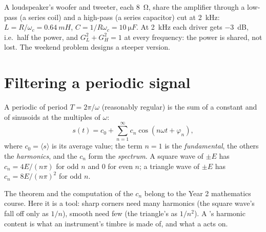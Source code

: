 \begin{example}[A crossover]\label{ex:b1:filters-transfer-functions:crossover}
A loudspeaker's woofer and tweeter, each \qty{8}{\ohm}, share the
amplifier through a low-pass (a series coil) and a high-pass (a series
capacitor) cut at \qty{2}{kHz}: $L = R/\omega_c = \qty{0.64}{mH}$,
$C = 1/R\omega_c = \qty{10}{\micro F}$. At \qty{2}{kHz} each driver gets
\qty{-3}{dB}, i.e.\ half the power, and $G_L^2 + G_H^2 = 1$ at every
frequency: the power is shared, not lost. The weekend problem designs
a steeper version.
\end{example}

\section{Filtering a periodic signal}

\begin{theorem}\label{thm:b1:filters-transfer-functions:fourier}
A periodic  of period $T = 2\pi/\omega$ (reasonably regular) is
the sum of a constant and of sinusoids at the multiples of $\omega$:
\[
s(t) = c_0 + \sum_{n = 1}^{\infty} c_n\cos(n\omega t + \varphi_n),
\]
where $c_0 = \langle s\rangle$ is its average value; the term $n = 1$ is
the \emph{fundamental}, the others the \emph{harmonics}, and the
 $c_n$ form the \emph{spectrum}. A square wave of 
$\pm E$ has $c_n = 4E/(n\pi)$ for odd $n$ and $0$ for even $n$; a
triangle wave of  $\pm E$ has $c_n = 8E/(n\pi)^2$ for odd $n$.
\end{theorem}
\admitted

\begin{remark}\label{rem:b1:filters-transfer-functions:fourier}
The theorem and the computation of the $c_n$ belong to the Year 2
mathematics course. Here it is a tool: sharp corners need many
harmonics (the square wave's fall off only as $1/n$), smooth 
need few (the triangle's as $1/n^2$). A 's harmonic content is
what an instrument's timbre is made of, and what a  acts on.
\end{remark}

